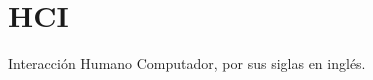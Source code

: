 \thispagestyle{plain}
\section{HCI}
	\par 
		Interacción Humano Computador, por sus siglas en inglés.
